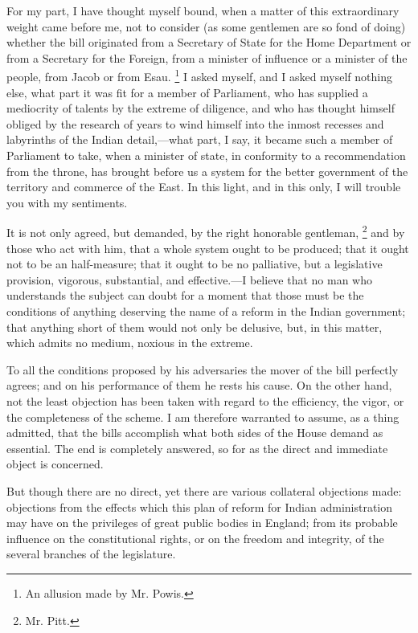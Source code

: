 For my part, I have thought myself bound, when a matter of this extraordinary weight came before me, not to consider (as some gentlemen are so fond of doing) whether the bill originated from a Secretary of State for the Home Department or from a Secretary for the Foreign, from a minister of influence or a minister of the people, from Jacob or from Esau.
\footnote{ An allusion made by Mr. Powis.}
 I asked myself, and I asked myself nothing else, what part it was fit for a member of Parliament, who has supplied a mediocrity of talents by the extreme of diligence, and who has thought himself obliged by the research of years to wind himself into the inmost recesses and labyrinths of the Indian detail,—what part, I say, it became such a member of Parliament to take, when a minister of state, in conformity to a recommendation from the throne, has brought before us a system for the better government of the territory and commerce of the East. In this light, and in this only, I will trouble you with my sentiments.

It is not only agreed, but demanded, by the right honorable gentleman,
\footnote{ Mr. Pitt.}
 and by those who act with him, that a whole system ought to be produced; that it ought not to be an half-measure; that it ought to be no palliative, but a legislative provision, vigorous, substantial, and effective.—I believe that no man who understands the subject can doubt for a moment that those must be the conditions of anything deserving the name of a reform in the Indian government; that anything short of them would not only be delusive, but, in this matter, which admits no medium, noxious in the extreme.

To all the conditions proposed by his adversaries the mover of the bill perfectly agrees; and on his performance of them he rests his cause. On the other hand, not the least objection has been taken with regard to the efficiency, the vigor, or the completeness of the scheme. I am therefore warranted to assume, as a thing admitted, that the bills accomplish what both sides of the House demand as essential. The end is completely answered, so for as the direct and immediate object is concerned.

But though there are no direct, yet there are various collateral objections made: objections from the effects which this plan of reform for Indian administration may have on the privileges of great public bodies in England; from its probable influence on the constitutional rights, or on the freedom and integrity, of the several branches of the legislature.

